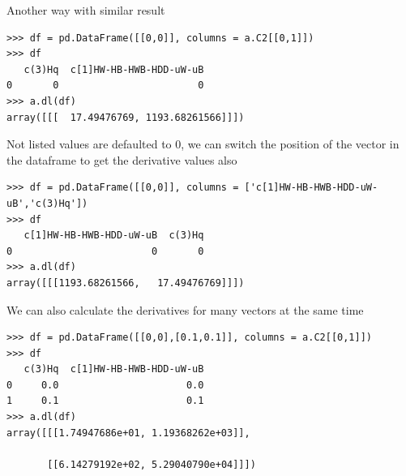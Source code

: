 \documentclass[12pt]{article}
\begin{document}
Another way with similar result
\begin{verbatim}
>>> df = pd.DataFrame([[0,0]], columns = a.C2[[0,1]])
>>> df
   c(3)Hq  c[1]HW-HB-HWB-HDD-uW-uB
0       0                        0
>>> a.dl(df)
array([[[  17.49476769, 1193.68261566]]])
\end{verbatim}
Not listed values are defaulted to 0, we can switch the position of the vector in the dataframe to get the derivative values also
\begin{verbatim}
>>> df = pd.DataFrame([[0,0]], columns = ['c[1]HW-HB-HWB-HDD-uW-uB','c(3)Hq'])
>>> df
   c[1]HW-HB-HWB-HDD-uW-uB  c(3)Hq
0                        0       0
>>> a.dl(df)
array([[[1193.68261566,   17.49476769]]])
\end{verbatim}
We can also calculate the derivatives for many vectors at the same time
\begin{verbatim}
>>> df = pd.DataFrame([[0,0],[0.1,0.1]], columns = a.C2[[0,1]])
>>> df
   c(3)Hq  c[1]HW-HB-HWB-HDD-uW-uB
0     0.0                      0.0
1     0.1                      0.1
>>> a.dl(df)
array([[[1.74947686e+01, 1.19368262e+03]],

       [[6.14279192e+02, 5.29040790e+04]]])
\end{verbatim}
\end{document}
